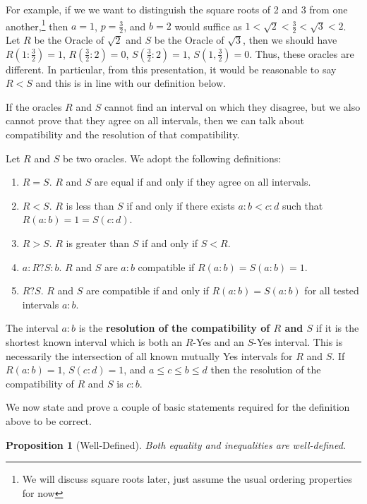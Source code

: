 \documentclass[12pt]{article}
\newtheorem{proposition}{Proposition}
\theoremstyle{remark}
\begin{document}
For example, if we we want to distinguish the square roots of 2 and 3 from one another,\footnote{We will discuss square roots later, just assume the usual ordering properties for now} then $a = 1$, $p = \tfrac{3}{2}$, and $b = 2$ would suffice as $1 < \sqrt{2} < \tfrac{3}{2} < \sqrt{3} < 2$. Let $R$ be the Oracle of $\sqrt{2}$ and $S$ be the Oracle of $\sqrt{3}$, then we should have $R(1:\tfrac{3}{2}) = 1$, $R(\tfrac{3}{2}:2) = 0$,  $S(\tfrac{3}{2}:2) = 1$, $S(1, \tfrac{3}{2}) = 0$. Thus, these oracles are different. In particular, from this presentation, it would be reasonable to say $R < S$ and this is in line with our definition below.

If the oracles $R$ and $S$ cannot find an interval on which they disagree, but we also cannot prove that they agree on all intervals, then we can talk about compatibility and the resolution of that compatibility.

Let $R$ and $S$ be two oracles. We adopt the following definitions:

\begin{enumerate}
    \item $R=S$. $R$ and $S$ are equal if and only if they agree on all intervals. 
    \item $R < S$. $R$ is less than $S$ if and only if there exists $a:b < c:d$ such that $R(a:b) =1 = S(c:d)$. 
    \item $R > S$. $R$ is greater than $S$ if and only if $S < R$.
    \item $a:R?S:b$. $R$ and $S$ are $a:b$ compatible if $R(a:b)=S(a:b) = 1$.
    \item $R ? S$. $R$ and $S$ are compatible if and only if $R(a:b) = S(a:b)$ for all tested intervals $a:b$. 
\end{enumerate}

The interval $a:b$ is the \textbf{resolution of the compatibility of $R$ and $S$} if it is the shortest known interval which is both an $R$-Yes and an $S$-Yes interval. This is necessarily the intersection of all known mutually Yes intervals for $R$ and $S$.  If $R(a:b) = 1$, $S(c:d) = 1$, and $ a \leq c \leq b \leq d$ then the resolution of the compatibility of $R$ and $S$ is $c:b$. 

We now state and prove a couple of basic statements required for the definition above to be correct. 

\begin{proposition}[Well-Defined]\label{pr:wd}
Both equality and inequalities are well-defined. 
\end{proposition}
\end{document}
